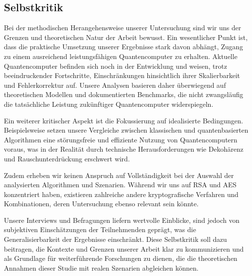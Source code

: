 \subsection{Selbstkritik}

Bei der methodischen Herangehensweise unserer Untersuchung sind wir uns der Grenzen und theoretischen Natur der Arbeit bewusst. 
Ein wesentlicher Punkt ist, dass die praktische Umsetzung unserer Ergebnisse stark davon abhängt, Zugang zu einem ausreichend 
leistungsfähigen Quantencomputer zu erhalten. Aktuelle Quantencomputer befinden sich noch in der Entwicklung und weisen, trotz 
beeindruckender Fortschritte, Einschränkungen hinsichtlich ihrer Skalierbarkeit und Fehlerkorrektur auf. Unsere Analysen basieren 
daher überwiegend auf theoretischen Modellen und dokumentierten Benchmarks, die nicht zwangsläufig die tatsächliche Leistung 
zukünftiger Quantencomputer widerspiegeln.

Ein weiterer kritischer Aspekt ist die Fokussierung auf idealisierte Bedingungen. Beispielsweise setzen unsere Vergleiche zwischen 
klassischen und quantenbasierten Algorithmen eine störungsfreie und effiziente Nutzung von Quantencomputern voraus, was in der
Realität durch technische Herausforderungen wie Dekohärenz und Rauschunterdrückung erschwert wird.

Zudem erheben wir keinen Anspruch auf Vollständigkeit bei der Auswahl der analysierten Algorithmen und Szenarien. Während wir uns 
auf RSA und AES konzentriert haben, existieren zahlreiche andere kryptografische Verfahren und Kombinationen, deren Untersuchung 
ebenso relevant sein könnte.

Unsere Interviews und Befragungen liefern wertvolle Einblicke, sind jedoch von subjektiven Einschätzungen der Teilnehmenden geprägt, 
was die Generalisierbarkeit der Ergebnisse einschränkt. Diese Selbstkritik soll dazu beitragen, die Kontexte und Grenzen unserer Arbeit
klar zu kommunizieren und als Grundlage für weiterführende Forschungen zu dienen, die die theoretischen Annahmen dieser Studie mit realen 
Szenarien abgleichen können.
